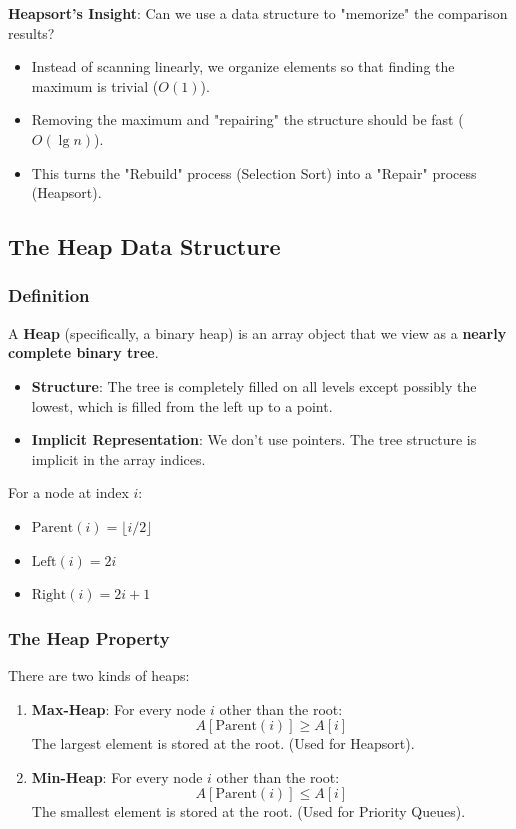 \documentclass[12pt]{article}
\theoremstyle{blueplain}
\theoremstyle{bluedef}
\theoremstyle{blueremark}
\begin{document}
\textbf{Heapsort's Insight}: Can we use a data structure to "memorize" the comparison results?
\begin{itemize}
    \item Instead of scanning linearly, we organize elements so that finding the maximum is trivial ($O(1)$).
    \item Removing the maximum and "repairing" the structure should be fast ($O(\lg n)$).
    \item This turns the "Rebuild" process (Selection Sort) into a "Repair" process (Heapsort).
\end{itemize}

\subsection{The Heap Data Structure}

\subsubsection{Definition}

A \textbf{Heap} (specifically, a binary heap) is an array object that we view as a \textbf{nearly complete binary tree}.
\begin{itemize}
    \item \textbf{Structure}: The tree is completely filled on all levels except possibly the lowest, which is filled from the left up to a point.
    \item \textbf{Implicit Representation}: We don't use pointers. The tree structure is implicit in the array indices.
\end{itemize}

For a node at index $i$:
\begin{itemize}
    \item $\text{Parent}(i) = \lfloor i/2 \rfloor$
    \item $\text{Left}(i) = 2i$
    \item $\text{Right}(i) = 2i + 1$
\end{itemize}

\subsubsection{The Heap Property}

There are two kinds of heaps:
\begin{enumerate}
    \item \textbf{Max-Heap}: For every node $i$ other than the root:
          \[ A[\text{Parent}(i)] \ge A[i] \]
          The largest element is stored at the root. (Used for Heapsort).
    \item \textbf{Min-Heap}: For every node $i$ other than the root:
          \[ A[\text{Parent}(i)] \le A[i] \]
          The smallest element is stored at the root. (Used for Priority Queues).
\end{enumerate}
\end{document}
